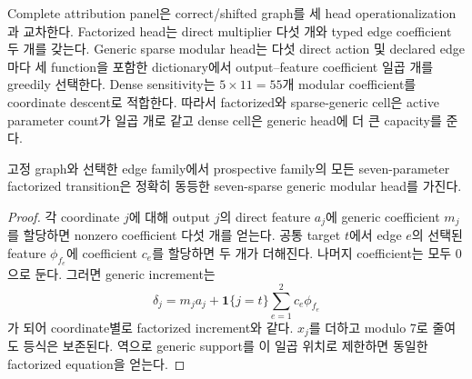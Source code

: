 Complete attribution panel은 correct/shifted graph를 세 head operationalization과
교차한다. Factorized head는 direct multiplier 다섯 개와 typed edge coefficient 두
개를 갖는다. Generic sparse modular head는 다섯 direct action 및 declared edge마다
세 function을 포함한 dictionary에서 output--feature coefficient 일곱 개를 greedily
선택한다. Dense sensitivity는 \(5\times11=55\)개 modular coefficient를 coordinate
descent로 적합한다. 따라서 factorized와 sparse-generic cell은 active parameter
count가 일곱 개로 같고 dense cell은 generic head에 더 큰 capacity를 준다.

\begin{proposition}
고정 graph와 선택한 edge family에서 prospective family의 모든 seven-parameter
factorized transition은 정확히 동등한 seven-sparse generic modular head를 가진다.
\end{proposition}
\begin{proof}
각 coordinate \(j\)에 대해 output \(j\)의 direct feature \(a_j\)에 generic
coefficient \(m_j\)를 할당하면 nonzero coefficient 다섯 개를 얻는다. 공통 target
\(t\)에서 edge \(e\)의 선택된 feature \(\phi_{f_e}\)에 coefficient \(c_e\)를
할당하면 두 개가 더해진다. 나머지 coefficient는 모두 0으로 둔다. 그러면 generic
increment는
\[
\delta_j=m_j a_j+\mathbf 1\{j=t\}\sum_{e=1}^{2}c_e\phi_{f_e}
\]
가 되어 coordinate별로 factorized increment와 같다. \(x_j\)를 더하고 modulo 7로
줄여도 등식은 보존된다. 역으로 generic support를 이 일곱 위치로 제한하면 동일한
factorized equation을 얻는다.
\end{proof}

